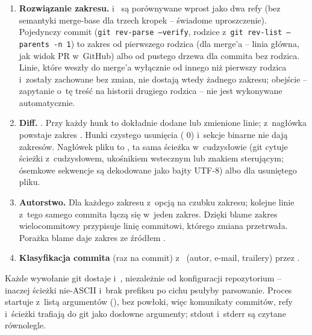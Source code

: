 \begin{enumerate}[leftmargin=*]
  \item \textbf{Rozwiązanie zakresu.}  i~ są porównywane
        wprost jako dwa refy (bez semantyki merge-base dla trzech kropek -- świadome
        uproszczenie). Pojedynczy commit (\texttt{git rev-parse --verify}, rodzice
        z~\texttt{git rev-list --parents -n 1}) to zakres od pierwszego rodzica (dla
        merge'a -- linia główna, jak widok PR w~GitHub) albo od pustego drzewa dla commita
        bez rodzica. Linie, które weszły do merge'a wyłącznie od innego niż pierwszy rodzica
        i~zostały zachowane bez zmian, nie dostają wtedy żadnego zakresu; obejście --
        zapytanie o~tę treść na historii drugiego rodzica -- nie jest wykonywane
        automatycznie.
  \item \textbf{Diff.} . Przy
         każdy hunk to dokładnie dodane lub zmienione linie; z~nagłówka
         powstaje zakres .
        Hunki czystego usunięcia ( 0) i~sekcje binarne nie dają zakresów.
        Nagłówek pliku to , ta sama ścieżka w~cudzysłowie (git
        cytuje ścieżki z~cudzysłowem, ukośnikiem wstecznym lub znakiem sterującym; ósemkowe
        sekwencje są dekodowane jako bajty UTF-8) albo  dla
        usuniętego pliku.
  \item \textbf{Autorstwo.} Dla każdego zakresu  z~opcją
         na czubku zakresu; kolejne linie z~tego samego commita
        łączą się w~jeden zakres.
        Dzięki blame zakres wielocommitowy przypisuje linię commitowi, którego zmiana
        przetrwała. Porażka blame daje zakres ze źródłem .
  \item \textbf{Klasyfikacja commita} (raz na commit) z~ (autor,
        e-mail, trailery) przez .
\end{enumerate}

Każde wywołanie git dostaje 
i~, niezależnie od konfiguracji repozytorium -- inaczej ścieżki nie-ASCII i~brak prefiksu
 po cichu psułyby parsowanie. Proces startuje z~listą argumentów
(), bez powłoki, więc komunikaty commitów, refy
i~ścieżki trafiają do git jako dosłowne argumenty; stdout i~stderr są czytane równolegle.


